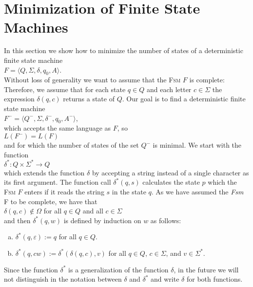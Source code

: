 \section{Minimization of Finite State Machines}
In this section we show how to minimize the number of states of a deterministic finite state machine
\\[0.2cm]
\hspace*{1.3cm}
$F = \langle Q, \Sigma, \delta, q_0, A \rangle$.
\\[0.2cm]
Without loss of generality we want to assume that the \textsc{Fsm} $F$ is complete: Therefore, we assume that
for each state $q \in Q$ and each letter $c \in \Sigma$ the expression $\delta(q, c)$ 
returns a state of $Q$.  Our goal is to find a deterministic finite state machine
\\[0.2cm]
\hspace*{1.3cm}
$F^- = \langle Q^-, \Sigma, \delta^-, q_0, A^- \rangle$,
\\[0.2cm]
which accepts the same language as  $F$, so 
\\[0.2cm]
\hspace*{1.3cm}
$L(F^-) = L(F)$
\\[0.2cm]
and for which the number of states of the set $Q^-$ is minimal.  
We start with the function 
\\[0.2cm]
\hspace*{1.3cm}
$\delta^*: Q \times \Sigma^* \rightarrow Q$
\\[0.2cm]
which extends the function $\delta$ by accepting a string instead of a single character as its first argument.
The function call $\delta^*(q,s)$ calculates the state $p$ which the \textsc{Fsm} $F$ enters if it reads the
string $s$ in the state $q$. As we have assumed the \textsl{Fsm} F to be complete, we have that
\\[0.2cm]
\hspace*{1.3cm}
$\delta(q, c) \not\in \Omega$ \quad for all $q \in Q$ and all $c \in \Sigma$ 
\\[0.2cm]
and then $\delta^*(q,w)$ is defined by induction on $w$ as follows:
\begin{enumerate}[(a)]
\item $\delta^*(q, \varepsilon) := q$ \quad for all $q \in Q$.
\item $\delta^*(q, cw) := \delta^*(\delta(q, c), v)$ \quad for all $q \in Q$, $c \in \Sigma$, and $v \in \Sigma^*$.
\end{enumerate}
Since the function $\delta^*$ is a generalization of the function $\delta$, in
the future we will not distinguish in the notation between $\delta$ and $\delta^*$ and write $\delta$ for both functions. 


